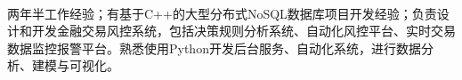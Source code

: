 \documentclass[11pt, a4paper, UTF8]{awesome-cv}
\begin{document}
\makecvheader[R]

\makecvfooter
  {\ }
  {\ }
  {\thepage}




\begin{cvparagraph}
两年半工作经验；有基于C++的大型分布式NoSQL数据库项目开发经验；负责设计和开发金融交易风控系统，包括决策规则分析系统、自动化风控平台、实时交易数据监控报警平台。熟悉使用Python开发后台服务、自动化系统，进行数据分析、建模与可视化。
\end{cvparagraph}
\end{document}
